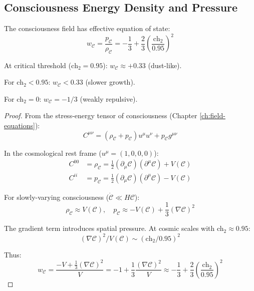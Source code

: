 \subsection{Consciousness Energy Density and Pressure}

\begin{proposition}\label{prop:consciousness-eos}
The consciousness field has effective equation of state:
\begin{equation}
w_{\mathcal{C}} = \frac{p_{\mathcal{C}}}{\rho_{\mathcal{C}}} = -\frac{1}{3} + \frac{2}{3} \left( \frac{\text{ch}_2}{0.95} \right)^2
\end{equation}

At critical threshold ($\text{ch}_2 = 0.95$): $w_{\mathcal{C}} \approx +0.33$ (dust-like).

For $\text{ch}_2 < 0.95$: $w_{\mathcal{C}} < 0.33$ (slower growth).

For $\text{ch}_2 = 0$: $w_{\mathcal{C}} = -1/3$ (weakly repulsive).
\end{proposition}

\begin{proof}
From the stress-energy tensor of consciousness (Chapter \ref{ch:field-equations}):
\begin{equation}
C^{\mu\nu} = \left( \rho_{\mathcal{C}} + p_{\mathcal{C}} \right) u^\mu u^\nu + p_{\mathcal{C}} g^{\mu\nu}
\end{equation}

In the cosmological rest frame ($u^\mu = (1,0,0,0)$):
\begin{align}
C^{00} &= \rho_{\mathcal{C}} = \frac{1}{2} (\partial_\mu \mathcal{C})(\partial^\mu \mathcal{C}) + V(\mathcal{C}) \\
C^{ii} &= p_{\mathcal{C}} = \frac{1}{2} (\partial_\mu \mathcal{C})(\partial^\mu \mathcal{C}) - V(\mathcal{C})
\end{align}

For slowly-varying consciousness ($\dot{\mathcal{C}} \ll H \mathcal{C}$):
\begin{equation}
\rho_{\mathcal{C}} \approx V(\mathcal{C}), \quad p_{\mathcal{C}} \approx -V(\mathcal{C}) + \frac{1}{3} (\nabla \mathcal{C})^2
\end{equation}

The gradient term introduces spatial pressure. At cosmic scales with ch$_2 \approx 0.95$:
\begin{equation}
(\nabla \mathcal{C})^2 / V(\mathcal{C}) \sim (\text{ch}_2 / 0.95)^2
\end{equation}

Thus:
\begin{equation}
w_{\mathcal{C}} = \frac{-V + \frac{1}{3}(\nabla \mathcal{C})^2}{V} = -1 + \frac{1}{3} \frac{(\nabla \mathcal{C})^2}{V} \approx -\frac{1}{3} + \frac{2}{3} \left( \frac{\text{ch}_2}{0.95} \right)^2
\end{equation}
\end{proof}

